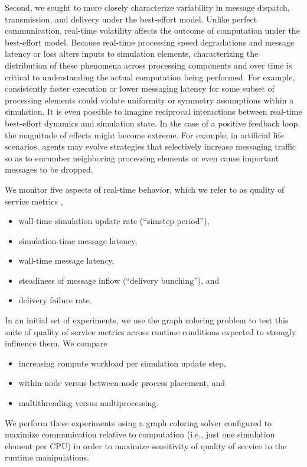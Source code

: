 Second, we sought to more closely characterize variability in message dispatch, transmission, and delivery under the best-effort model.
Unlike perfect communication, real-time volatility affects the outcome of computation under the best-effort model.
Because real-time processing speed degradations and message latency or loss alters inputs to simulation elements, characterizing the distribution of these phenomena across processing components and over time is critical to understanding the actual computation being performed.
For example, consistently faster execution or lower messaging latency for some subset of processing elements could violate uniformity or symmetry assumptions within a simulation.
It is even possible to imagine reciprocal interactions between real-time best-effort dynamics and simulation state.
In the case of a positive feedback loop, the magnitude of effects might become extreme.
For example, in artificial life scenarios, agents may evolve strategies that selectively increase messaging traffic so as to encumber neighboring processing elements or even cause important messages to be dropped.

We monitor five aspects of real-time behavior, which we refer to as quality of service metrics \citep{karakus2017quality},
\begin{itemize}
  \item wall-time simulation update rate (``simstep period''),
  \item simulation-time message latency,
  \item wall-time message latency,
  \item steadiness of message inflow (``delivery bunching''), and
  \item delivery failure rate.
\end{itemize}

In an initial set of experiments, we use the graph coloring problem to test this suite of quality of service metrics across runtime conditions expected to strongly influence them.
We compare
\begin{itemize}
  \item increasing compute workload per simulation update step,
  \item within-node versus between-node process placement, and
  \item multithreading versus multiprocessing.
\end{itemize}
We perform these experiments using a graph coloring solver configured to maximize communication relative to computation (i.e., just one simulation element per CPU) in order to maximize sensitivity of quality of service to the runtime manipulations.

